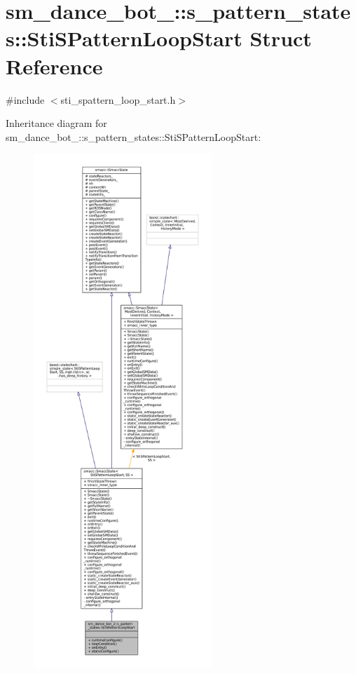 \hypertarget{structsm__dance__bot__2_1_1s__pattern__states_1_1StiSPatternLoopStart}{}\section{sm\+\_\+dance\+\_\+bot\+\_\+:\+:s\+\_\+pattern\+\_\+states\+:\+:Sti\+S\+Pattern\+Loop\+Start Struct Reference}
\label{structsm__dance__bot__2_1_1s__pattern__states_1_1StiSPatternLoopStart}


{\ttfamily \#include $<$sti\+\_\+spattern\+\_\+loop\+\_\+start.\+h$>$}



Inheritance diagram for sm\+\_\+dance\+\_\+bot\+\_\+:\+:s\+\_\+pattern\+\_\+states\+:\+:Sti\+S\+Pattern\+Loop\+Start\+:
\nopagebreak
\begin{figure}[H]
\begin{center}
\leavevmode
\includegraphics[height=550pt]{structsm__dance__bot__2_1_1s__pattern__states_1_1StiSPatternLoopStart__inherit__graph}
\end{center}
\end{figure}



